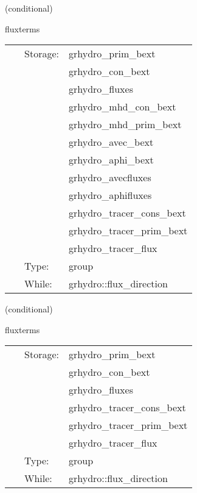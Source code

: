 \documentclass{article}
\begin{document}
\vspace{5mm}

   (conditional) 

\hspace{5mm} fluxterms 

\hspace{5mm}{\it calculation of intercell fluxes } 


\hspace{5mm}

 \begin{tabular*}{160mm}{cll} 
~ & Storage:  & grhydro\_prim\_bext \\ 
~& ~ &grhydro\_con\_bext\\ 
~& ~ &grhydro\_fluxes\\ 
~& ~ &grhydro\_mhd\_con\_bext\\ 
~& ~ &grhydro\_mhd\_prim\_bext\\ 
~& ~ &grhydro\_avec\_bext\\ 
~& ~ &grhydro\_aphi\_bext\\ 
~& ~ &grhydro\_avecfluxes\\ 
~& ~ &grhydro\_aphifluxes\\ 
~& ~ &grhydro\_tracer\_cons\_bext\\ 
~& ~ &grhydro\_tracer\_prim\_bext\\ 
~& ~ &grhydro\_tracer\_flux\\ 
~ & Type:  & group \\ 
~ & While:  & grhydro::flux\_direction \\ 
\end{tabular*} 


\vspace{5mm}

   (conditional) 

\hspace{5mm} fluxterms 

\hspace{5mm}{\it calculation of intercell fluxes } 


\hspace{5mm}

 \begin{tabular*}{160mm}{cll} 
~ & Storage:  & grhydro\_prim\_bext \\ 
~& ~ &grhydro\_con\_bext\\ 
~& ~ &grhydro\_fluxes\\ 
~& ~ &grhydro\_tracer\_cons\_bext\\ 
~& ~ &grhydro\_tracer\_prim\_bext\\ 
~& ~ &grhydro\_tracer\_flux\\ 
~ & Type:  & group \\ 
~ & While:  & grhydro::flux\_direction \\ 
\end{tabular*} 
\end{document}
